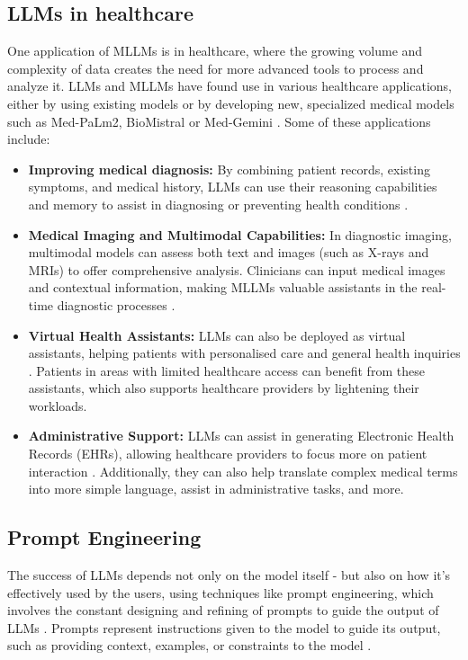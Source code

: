 \subsection{LLMs in healthcare}

One application of MLLMs is in healthcare, where the growing volume and complexity of data creates the need for more advanced tools to process and analyze it. LLMs and MLLMs have found use in various healthcare applications, either by using existing models or by developing new, specialized medical models such as Med-PaLm2, BioMistral or Med-Gemini \parencite{biomistral,medgemini,medpalm2}. Some of these applications include:

\begin{itemize}
    \item \textbf{Improving medical diagnosis:} By combining patient records, existing symptoms, and medical history, LLMs can use their reasoning capabilities and memory to assist in diagnosing or preventing health conditions \parencite{llm_healthcare,llm_healthcare3,llm_healthcare4}.
    \item \textbf{Medical Imaging and Multimodal Capabilities:} In diagnostic imaging, multimodal models can assess both text and images (such as X-rays and MRIs) to offer comprehensive analysis. Clinicians can input medical images and contextual information, making MLLMs valuable assistants in the real-time diagnostic processes \parencite{llm_healthcare3}.
    \item \textbf{Virtual Health Assistants:} LLMs can also be deployed as virtual assistants, helping patients with personalised care and general health inquiries \parencite{llm_healthcare,llm_healthcare3}. Patients in areas with limited healthcare access can benefit from these assistants, which also supports healthcare providers by lightening their workloads.
    \item \textbf{Administrative Support:} LLMs can assist in generating Electronic Health Records (EHRs), allowing healthcare providers to focus more on patient interaction \parencite{llm_healthcare4}. Additionally, they can also help translate complex medical terms into more simple language, assist in administrative tasks, and more.
\end{itemize}

\subsection{Prompt Engineering}

The success of LLMs depends not only on the model itself - but also on how it's effectively used by the users, using techniques like prompt engineering, which involves the constant designing and refining of prompts to guide the output of LLMs \parencite{promptmed,prompt2}. Prompts represent instructions given to the model to guide its output, such as providing context, examples, or constraints to the model \parencite{prompt,prompt1,prompt2}. 

